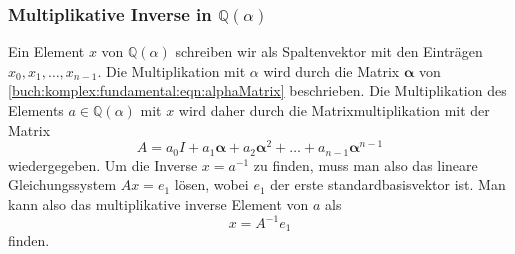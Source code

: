 \subsubsection{Multiplikative Inverse in $\mathbb{Q}(\alpha)$}
Ein Element $x$ von $\mathbb{Q}(\alpha)$ schreiben wir als Spaltenvektor mit
den Einträgen $x_0,x_1,\dots,x_{n-1}$.
Die Multiplikation mit $\alpha$ wird durch die Matrix $\bm{\alpha}$ von
\eqref{buch:komplex:fundamental:eqn:alphaMatrix} beschrieben.
Die Multiplikation des Elements $a\in \mathbb{Q}(\alpha)$ mit $x$ wird
daher durch die Matrixmultiplikation mit der Matrix
\[
A
=
a_0I+a_1\bm{\alpha} + a_2\bm{\alpha}^2 + \ldots + a_{n-1}\bm{\alpha}^{n-1}
\]
wiedergegeben.
Um die Inverse $x=a^{-1}$ zu finden, muss man also das lineare
Gleichungssystem
$ Ax=e_1 $ lösen, wobei $e_1$ der erste standardbasisvektor ist.
Man kann also das multiplikative inverse Element von $a$ als
\[
x = A^{-1}e_1
\]
finden.

%
%
